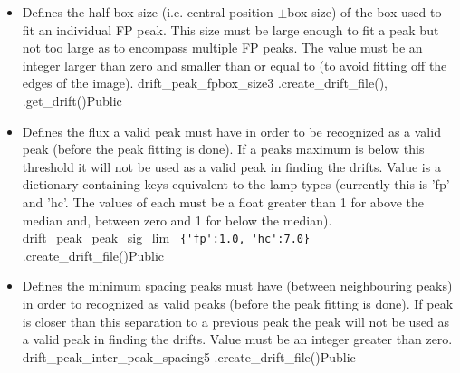 \begin{itemize}
\item {} 
{Defines the half-box size (i.e. central position $\pm$box size) of the box used to fit an individual FP peak. This size must be large enough to fit a peak but not too large as to encompass multiple FP peaks. The value must be an integer larger than zero and smaller than or equal to  (to avoid fitting off the edges of the image).}
{drift\_peak\_fpbox\_size}{3}
{\calDRIFTPEAK}{\constantsfile}{\spirouRV.create\_drift\_file(), \spirouRV.get\_drift()}{Public}



\item {}
{Defines the flux a valid peak must have in order to be recognized as a valid peak (before the peak fitting is done). If a peaks maximum is below this threshold it will not be used as a valid peak in finding the drifts. Value is a dictionary containing keys equivalent to the lamp types (currently this is 'fp' and 'hc'. The values of each must be a float greater than 1 for above the median and, between zero and 1 for below the median).}
{drift\_peak\_peak\_sig\_lim}
{\lstinline[style=pythoninline]| {'fp':1.0, 'hc':7.0} |}
{\calDRIFTPEAK}{\constantsfile}{\spirouRV.create\_drift\_file()}{Public}


\item {}
{Defines the minimum spacing peaks must have (between neighbouring peaks) in order to recognized as valid peaks (before the peak fitting is done). If peak is closer than this separation to a previous peak the peak will not be used as a valid peak in finding the drifts. Value must be an integer greater than zero.}
{drift\_peak\_inter\_peak\_spacing}{5}
{\calDRIFTPEAK}{\constantsfile}{\spirouRV.create\_drift\_file()}{Public}



\end{itemize}
